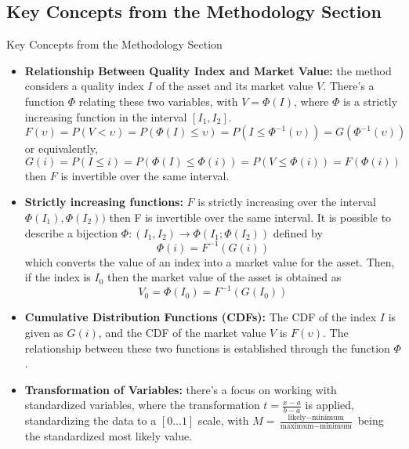 \documentclass{beamer}
\begin{document}
\subsection{Key Concepts from the Methodology Section}

\begin{frame}[allowframebreaks]{Key Concepts from the Methodology Section}
	\begin{itemize}
        \item \textbf{Relationship Between Quality Index and Market Value:} the method considers a quality index \(I\) of the asset and its market value \(V\). There's a function \(\Phi\) relating these two variables, with \(V=\Phi(I)\), where \(\Phi\) is a strictly increasing function in the interval \([I_{1}, I_{2}]\).
        \begin{equation}
        	F(\upsilon) = P(V < \upsilon) = P(\Phi(I) \leq \upsilon) = P(I \leq \Phi^{-1}(\upsilon)) = G(\Phi^{-1}(\upsilon))
        \end{equation}
        or equivalently,
        \begin{equation}
        	G(i) = P(I \leq i) = P(\Phi(I) \leq \Phi(i)) = P(V \leq \Phi(i)) = F(\Phi(i))
        \end{equation}
        then \(F\) is invertible over the same interval.
        \item \textbf{Strictly increasing functions:} \(F\) is strictly increasing over the interval \(\Phi(I_{1}), \Phi(I_{2}))\) then F is invertible over the same interval. It is possible to describe a bijection \(\Phi: (I_{1}, I_{2}) \rightarrow \Phi(I_{1}; \Phi(I_{2}))\) defined by
        \begin{equation}
        	\Phi(i) = F^{-1}(G(i))
        \end{equation}
        which converts the value of an index into a market value for the asset. Then, if the index is \(I_{0}\) then the market value of the asset is obtained as
        \begin{equation}
        	V_{0} = \Phi(I_{0}) = F^{-1} (G(I_{0}))
        \end{equation}
       	\item \textbf{Cumulative Distribution Functions (CDFs):} The CDF of the index \(I\) is given as \(G(i)\), and the CDF of the market value \(V\) is \(F(\upsilon)\). The relationship between these two functions is established through the function \(\Phi\).
       	\item \textbf{Transformation of Variables:} there's a focus on working with standardized variables, where the transformation \( t = \frac{x - a}{b - a} \) is applied, standardizing the data to a \( [0 \ldots 1] \) scale, with \( M = \frac{\text{likely} - \text{minimum}}{\text{maximum} - \text{minimum}} \) being the standardized most likely value.

\end{itemize}
\end{frame}
\end{document}

